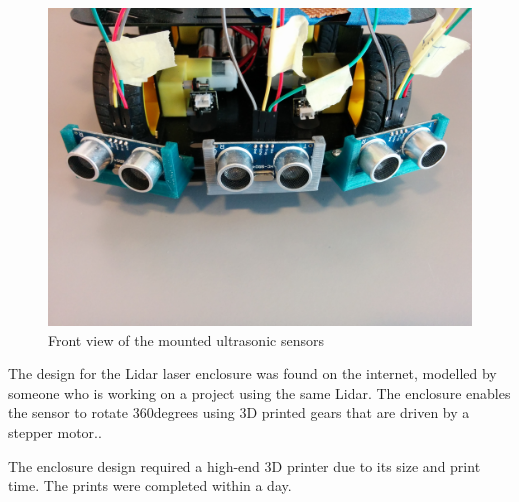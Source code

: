 \begin{figure}[H]
	\centering
	\includegraphics[width=.6\linewidth]{images/mounted_ultrasonic_sensors.jpg}
	\caption{Front view of the mounted ultrasonic sensors}
\end{figure}

The design for the Lidar laser enclosure was found on the internet, modelled by someone who is working on a project using the same Lidar. The enclosure enables the sensor to rotate 360degrees using 3D printed gears that are driven by a stepper motor.\cite{lidarenclosure}.

The enclosure design required a high-end 3D printer due to its size and print time. The prints were completed within a day.

